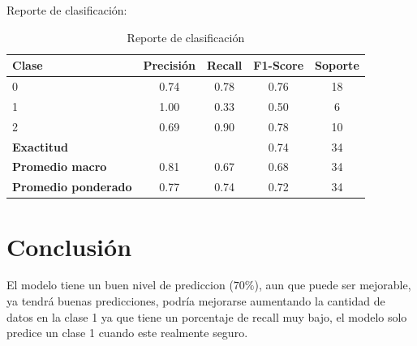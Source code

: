 Reporte de clasificación:
\begin{table}[h]
    \centering
    \begin{tabular}{lcccc}
        \toprule
        \textbf{Clase} & \textbf{Precisión} & \textbf{Recall} & \textbf{F1-Score} & \textbf{Soporte} \\
        \midrule
        0 & 0.74 & 0.78 & 0.76 & 18 \\
        1 & 1.00 & 0.33 & 0.50 & 6 \\
        2 & 0.69 & 0.90 & 0.78 & 10 \\
        \midrule
        \multicolumn{3}{l}{\textbf{Exactitud}} & 0.74 & 34 \\
        \midrule
        \textbf{Promedio macro} & 0.81 & 0.67 & 0.68 & 34 \\
        \textbf{Promedio ponderado} & 0.77 & 0.74 & 0.72 & 34 \\
        \bottomrule
    \end{tabular}
    \caption{Reporte de clasificación}
    \label{tab:reporte_clasificacion}
\end{table}
\section{Conclusión}
El modelo tiene un buen nivel de prediccion ($70\%$), aun que puede ser mejorable, ya tendrá buenas predicciones, podría mejorarse aumentando la cantidad de datos en la clase 1 ya que tiene un porcentaje de recall muy bajo, el modelo solo predice un clase 1 cuando este realmente seguro.